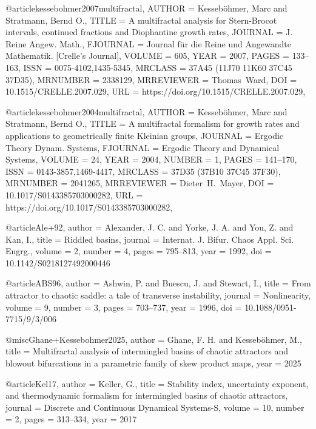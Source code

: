 @article{kessebohmer2007multifractal,
    AUTHOR = {Kesseb\"ohmer, Marc and Stratmann, Bernd O.},
     TITLE = {A multifractal analysis for {S}tern-{B}rocot intervals,
              continued fractions and {D}iophantine growth rates},
   JOURNAL = {J. Reine Angew. Math.},
  FJOURNAL = {Journal f\"ur die Reine und Angewandte Mathematik. [Crelle's
              Journal]},
    VOLUME = {605},
      YEAR = {2007},
     PAGES = {133--163},
      ISSN = {0075-4102,1435-5345},
   MRCLASS = {37A45 (11J70 11K60 37C45 37D35)},
  MRNUMBER = {2338129},
MRREVIEWER = {Thomas\ Ward},
       DOI = {10.1515/CRELLE.2007.029},
       URL = {https://doi.org/10.1515/CRELLE.2007.029},
}

@article{kessebohmer2004multifractal,
    AUTHOR = {Kesseb\"ohmer, Marc and Stratmann, Bernd O.},
     TITLE = {A multifractal formalism for growth rates and applications to
              geometrically finite {K}leinian groups},
   JOURNAL = {Ergodic Theory Dynam. Systems},
  FJOURNAL = {Ergodic Theory and Dynamical Systems},
    VOLUME = {24},
      YEAR = {2004},
    NUMBER = {1},
     PAGES = {141--170},
      ISSN = {0143-3857,1469-4417},
   MRCLASS = {37D35 (37B10 37C45 37F30)},
  MRNUMBER = {2041265},
MRREVIEWER = {Dieter\ H.\ Mayer},
       DOI = {10.1017/S0143385703000282},
       URL = {https://doi.org/10.1017/S0143385703000282},
}



@article{Ale+92,
  author = {Alexander, J. C. and Yorke, J. A. and You, Z. and Kan, I.},
  title = {Riddled basins},
  journal = {Internat. J. Bifur. Chaos Appl. Sci. Engrg.},
  volume = {2},
  number = {4},
  pages = {795--813},
  year = {1992},
  doi = {10.1142/S0218127492000446}
}

@article{ABS96,
  author = {Ashwin, P. and Buescu, J. and Stewart, I.},
  title = {From attractor to chaotic saddle: a tale of transverse instability},
  journal = {Nonlinearity},
  volume = {9},
  number = {3},
  pages = {703--737},
  year = {1996},
  doi = {10.1088/0951-7715/9/3/006}
}

@misc{Ghane+Kessebohmer2025,
  author = {Ghane, F. H. and Kesseb{\"o}hmer, M.},
  title = {Multifractal analysis of intermingled basins of chaotic attractors and blowout bifurcations in a parametric family of skew product maps},
  year = {2025}
}

@article{Kel17,
  author = {Keller, G.},
  title = {Stability index, uncertainty exponent, and thermodynamic formalism for intermingled basins of chaotic attractors},
  journal = {Discrete and Continuous Dynamical Systems-S},
  volume = {10},
  number = {2},
  pages = {313--334},
  year = {2017}
}

